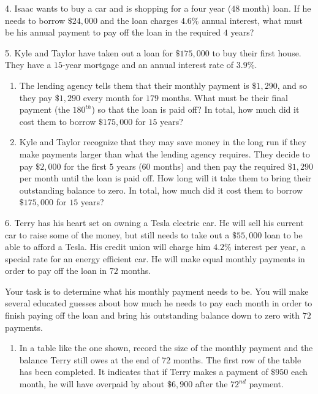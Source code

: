\documentclass[10pt,]{book}
\theoremstyle{plain}
\theoremstyle{definition}
\theoremstyle{definition}
\theoremstyle{definition}
\numberwithin{equation}{section}
\begin{document}
\begin{exerciselist}
\par\smallskip
\item[4.]\hypertarget{exercise-15}{}Isaac wants to buy a car and is shopping for a four year (\(48\) month) loan. If he needs to borrow \(\$24,000\) and the loan charges \(4.6\%\) annual interest, what must be his annual payment to pay off the loan in the required \(4\) years?%
\par\smallskip
\item[5.]\hypertarget{exercise-16}{}Kyle and Taylor have taken out a loan for \(\$175,000\) to buy their first house. They have a \(15\)-year mortgage and an annual interest rate of \(3.9\%\). \leavevmode%
\begin{enumerate}[label=(\alph*)]
\item\hypertarget{li-52}{}The lending agency tells them that their monthly payment is \(\$1,290\), and so they pay \(\$1,290\) every month for \(179\) months. What must be their final payment (the \(180^{th}\)) so that the loan is paid off?  In total, how much did it cost them to borrow \(\$175,000\) for \(15\) years?%
\item\hypertarget{li-53}{}Kyle and Taylor recognize that they may save money in the long run if they make payments larger than what the lending agency requires. They decide to pay \(\$2,000\) for the first \(5\) years (\(60\) months) and then pay the required \(\$1,290\) per month until the loan is paid off. How long will it take them to bring their outstanding balance to zero. In total, how much did it cost them to borrow \(\$175,000\) for \(15\) years?%
\end{enumerate}
%
\par\smallskip
\item[6.]\hypertarget{exercise-17}{}Terry has his heart set on owning a Tesla electric car. He will sell his current car to raise some of the money, but still needs to take out a \(\$55,000\) loan to be able to afford a Tesla. His credit union will charge him \(4.2\%\) interest per year, a special rate for an energy efficient car. He will make equal monthly payments in order to pay off the loan in \(72\) months.%
\par
Your task is to determine what his monthly payment needs to be. You will make several educated guesses about how much he needs to pay each month in order to finish paying off the loan and bring his outstanding balance down to zero with \(72\) payments. \leavevmode%
\begin{enumerate}[label=(\alph*)]
\item\hypertarget{li-54}{}In a table like the one shown, record the size of the monthly payment and the balance Terry still owes at the end of 72 months. The first row of the table has been completed. It indicates that if Terry makes a payment of \(\$950\) each month, he will have overpaid by about \(\$6,900\) after the \(72^{nd}\) payment. \leavevmode%

\end{enumerate}
\end{exerciselist}
\end{document}
